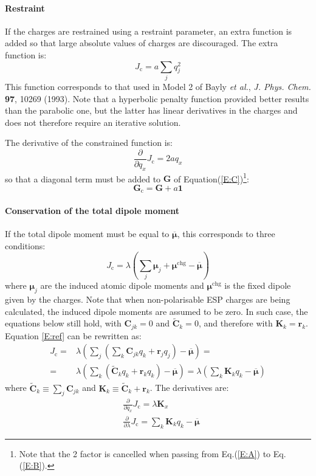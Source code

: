 \documentclass[a4paper]{report}
\newcommand{\bs}{\boldsymbol}
\newcommand{\mr}{\mathrm}
\begin{document}
\paragraph{Restraint}

If the charges are restrained using a restraint parameter, an extra function is added
so that large absolute values of charges are discouraged. The extra function is:
\begin{equation}
J_\mr{c} = a \sum_j q_j^2
\end{equation}
This function corresponds to that used in Model 2 of Bayly \emph{et al.}, \emph{J.
Phys. Chem.} \textbf{97}, 10269 (1993). Note that a hyperbolic penalty function
provided better results than the parabolic one, but the latter has linear derivatives
in the charges and does not therefore require an iterative solution.

The derivative of the constrained function is:
\begin{equation}
\frac{\partial}{\partial q_x} J_\mr{c} = 2 a q_x
\end{equation}
so that a diagonal term must be added to $\bs{G}$ of Equation(\ref{E:C})\footnote{Note that the 2 factor is cancelled when passing from Eq.(\protect\ref{E:A}) to Eq.(\protect\ref{E:B}).}:
\begin{equation}
\bs{G}_\mr{c} = \bs{G} + a \bs{1}
\end{equation}

\paragraph{Conservation of the total dipole moment}

If the total dipole moment must be equal to $\overline{\bs{\mu}}$, this corresponds
to three conditions:
\begin{equation}
J_\mr{c} = \lambda \left(\sum_j \bs{\mu}_j + \bs{\mu}^\mr{chg} - \overline{\bs{\mu}}
\right) 
\label{E:ref}
\end{equation}
where $\bs{\mu}_j$ are the induced atomic dipole moments and $\bs{\mu}^\mr{chg}$ is the
fixed dipole given by the charges. Note that when non-polarisable ESP charges are
being calculated, the induced dipole moments are assumed to be zero. In such case,
the equations below still hold, with $\bs{C}_{jk} = 0$ and $\tilde{\bs{C}}_k = 0$,
and therefore with $\bs{K}_k = \bs{r}_k$. Equation \ref{E:ref} can be rewritten as:
\begin{align}
J_\mr{c} =& \lambda \left(\sum_j \left(\sum_k \bs{C}_{jk} q_k + 
\bs{r}_j q_j\right) - \overline{\bs{\mu}} \right) = \nonumber \\
=& \lambda \left(\sum_k \left( \tilde{\bs{C}}_k q_k + \bs{r}_k q_k \right)-
\overline{\bs{\mu}} \right) = \lambda \left(\sum_k \bs{K}_k q_k -
\overline{\bs{\mu}} \right)
\end{align}
where $\tilde{\bs{C}}_k \equiv \sum_j \bs{C}_{jk}$ and $\bs{K}_k \equiv
\tilde{\bs{C}}_k + \bs{r}_k$. The derivatives are:
\begin{align}
&\frac{\partial}{\partial q_x} J_\mr{c} = \lambda \bs{K}_x \\
&\frac{\partial}{\partial \lambda} J_\mr{c} = \sum_k \bs{K}_k q_k -
\overline{\bs{\mu}}
\end{align}
\end{document}

